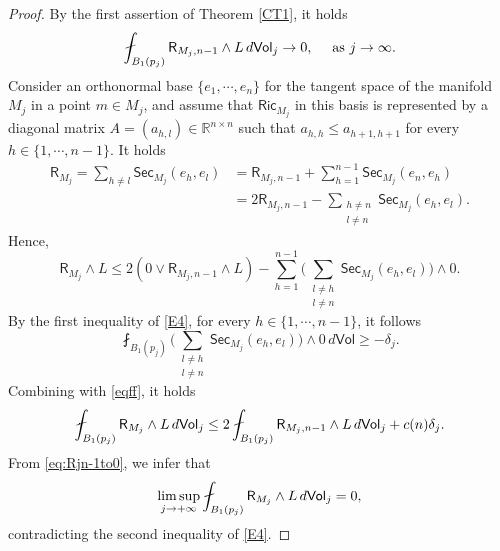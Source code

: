 \documentclass[10pt,a4paper]{amsart}
\newcommand{\R}{\mathsf{R}}
\newcommand{\Ric}{\mathsf{Ric}}
\newcommand{\bb}[1]{\mathbb{#1}}
\newcommand{\de}{{\rm d}}
\newcommand{\ssf}[1]{\mathsf{#1}}
\begin{document}
\begin{proof}
By the first assertion of Theorem \ref{CT1}, it holds
\begin{equation}\label{eq:Rjn-1to0}
\fint_{B_1(p_j)} \R_{M_j,n-1} \wedge L \,\de\ssf{Vol}_j \to 0, \quad \text{ as } j\to \infty.
\end{equation}
Consider an orthonormal base $\{e_1,\cdots,e_n\}$ for the tangent space of the manifold $M_j$ in a point $m \in M_j$, and assume that $\Ric_{M_j}$ in this basis is represented by a diagonal matrix $A=(a_{h,l}) \in \bb{R}^{n \times n}$ such that $a_{h,h} \leq a_{h+1,h+1}$ for every $h \in \{1, \cdots ,n-1\}$. It holds
\begin{align*}
\R_{M_j} = \sum_{h \neq l} \ssf{Sec}_{M_j}(e_h,e_l)&=\R_{M_j,n-1}+\sum_{h=1}^{n-1} \ssf{Sec}_{M_j}(e_n,e_h) \\
&=2\R_{M_j,n-1}-\sum_{\substack{ h \neq n \\ l \neq n}}\ssf{Sec}_{M_j}(e_h,e_l).
\end{align*}
Hence,
\begin{equation} \label{eqff}
\R_{M_j} \wedge L \leq 2(0 \vee \R_{M_j,n-1} \wedge L)-\sum_{h=1}^{n-1}\Big(\sum_{\substack{ l \neq h \\ l \neq n}}\ssf{Sec}_{M_j} (e_h,e_l)\Big) \wedge 0. 
\end{equation}
By the first inequality of \eqref{E4}, for every $h \in \{1,\cdots,n-1\}$, it follows
\[
\fint_{B_1(p_j)}\Big(\sum_{\substack{ l \neq h \\ l \neq n}}\ssf{Sec}_{M_j} (e_h,e_l)\Big) \wedge 0 \, d\ssf{Vol} \geq -\delta_j.
\]
Combining with \eqref{eqff}, it holds
\[
\fint_{B_1(p_j)} \R_{M_j} \wedge L \,\de\ssf{Vol}_j \leq 2\fint_{B_1(p_j)} \R_{M_j,n-1} \wedge L \,\de\ssf{Vol}_j + c(n)\delta_j.
\]
From \eqref{eq:Rjn-1to0}, we infer that
\[
\limsup_{j \to +\infty} \fint_{B_1(p_j)} \R_{M_j} \wedge L \,\de\ssf{Vol}_j= 0,
\]
contradicting the second inequality of \eqref{E4}.
\end{proof}
\end{document}
